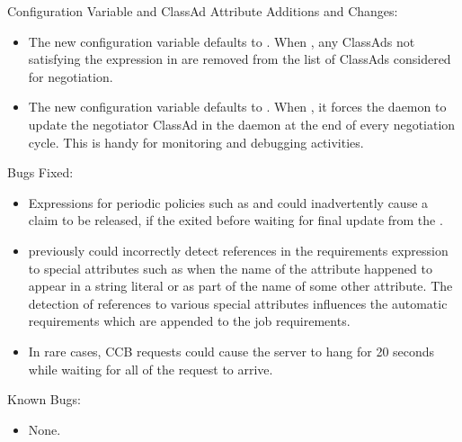 \noindent Configuration Variable and ClassAd Attribute Additions and Changes:

\begin{itemize}

\item The new configuration variable 
 defaults to .
When , any ClassAds not satisfying the expression 
in  are removed from the
list of  ClassAds considered for negotiation.

\item The new configuration variable
 defaults to .
When , it forces the  daemon
to update the negotiator ClassAd in the  daemon
at the end of every negotiation cycle.  
This is handy for monitoring and debugging activities.

\end{itemize}

\noindent Bugs Fixed:

\begin{itemize}

\item Expressions for periodic policies such as 
 and  
could inadvertently cause a claim to be released,
 if the  exited before waiting for final update from the 
. 

\item {} previously could incorrectly detect references
in the requirements expression to special attributes such as
 when the name of the attribute happened to appear in a
string literal or as part of the name of some other attribute.  
The detection of references to various special attributes influences the
automatic requirements which are appended to the job requirements.

\item In rare cases, CCB requests could cause the server to hang for
20 seconds while waiting for all of the request to arrive.

\end{itemize}

\noindent Known Bugs:

\begin{itemize}

\item None.

\end{itemize}

